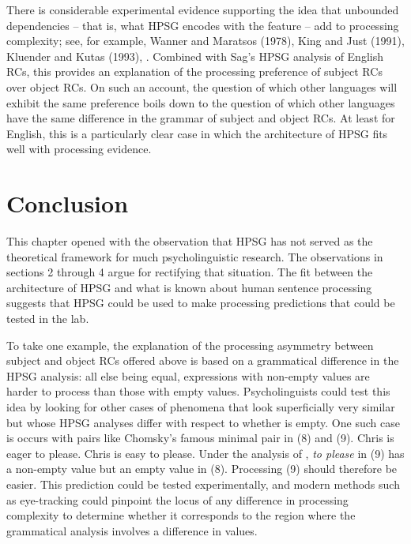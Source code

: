 \documentclass[a4paper]{article}
\begin{document}
There is considerable experimental evidence supporting the idea that unbounded dependencies -- that is, what HPSG encodes with the \slasch feature -- add to processing complexity; see, for example, Wanner and Maratsos (1978), King and Just (1991), Kluender and Kutas (1993), \citet{Hawkins99a}.  Combined with Sag's HPSG analysis of English RCs, this provides an explanation of the processing preference of subject RCs over object RCs.  On such an account, the question of which other languages will exhibit the same preference boils down to the question of which other languages have the same difference in the grammar of subject and object RCs.  At least for English, this is a particularly clear case in which the architecture of HPSG fits well with processing evidence.

\section{Conclusion}

This chapter opened with the observation that HPSG has not served as the theoretical framework for much psycholinguistic research.  The observations in sections 2 through 4 argue for rectifying that situation.  The fit between the architecture of HPSG and what is known about human sentence processing suggests that HPSG could be used to make processing predictions that could be tested in the lab.  

To take one example, the explanation of the processing asymmetry between subject and object RCs offered above is based on a grammatical difference in the HPSG analysis:  all else being equal, expressions with non-empty \slasch values are harder to process than those with empty \slasch values.  Psycholinguists could test this idea by looking for other cases of phenomena that look superficially very similar but whose HPSG analyses differ with respect to whether \slasch is empty.  One such case is occurs with pairs like Chomsky's famous minimal pair in (8) and (9).
\eal
\ex Chris is eager to please.
\ex Chris is easy to please.
\zl
Under the analysis of \citet{ps2}, {\it to please} in (9) has a non-empty \slasch value but an empty \slasch value in (8).  Processing (9) should therefore be easier.  This prediction could be tested experimentally, and modern methods such as eye-tracking could pinpoint the locus of any difference in processing complexity to determine whether it corresponds to the region where the grammatical analysis involves a difference in \slasch values.
\end{document}
